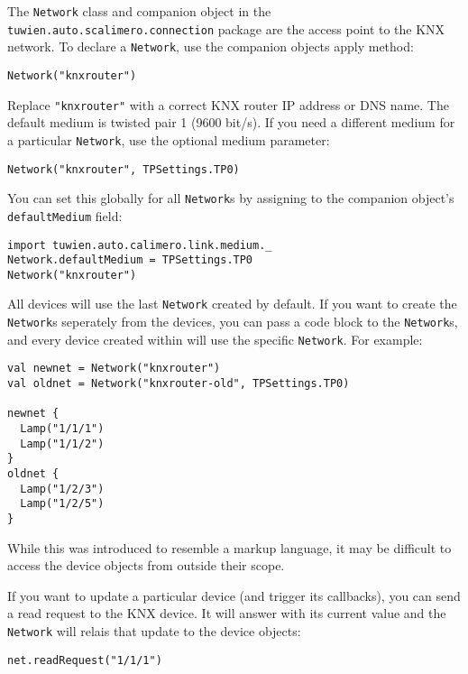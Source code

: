 The \lstinline!Network! class and companion object in the \lstinline!tuwien.auto.scalimero.connection! package are the access point to the KNX network. To declare a \lstinline!Network!, use the companion objects apply method:

\begin{lstlisting}
Network("knxrouter")
\end{lstlisting}

Replace \lstinline!"knxrouter"! with a correct KNX router IP address or DNS name. The default medium is twisted pair 1 (9600 bit/s). If you need a different medium for a particular \lstinline!Network!, use the optional medium parameter:

\begin{lstlisting}
Network("knxrouter", TPSettings.TP0)
\end{lstlisting}

You can set this globally for all \lstinline!Network!s by assigning to the companion object's \lstinline!defaultMedium! field:

\begin{lstlisting}
import tuwien.auto.calimero.link.medium._
Network.defaultMedium = TPSettings.TP0
Network("knxrouter")
\end{lstlisting}

All devices will use the last \lstinline!Network! created by default. If you want to create the \lstinline!Network!s seperately from the devices, you can pass a code block to the \lstinline!Network!s, and every device created within will use the specific \lstinline!Network!. For example:

\begin{lstlisting}
val newnet = Network("knxrouter")
val oldnet = Network("knxrouter-old", TPSettings.TP0)

newnet {
  Lamp("1/1/1")
  Lamp("1/1/2")
}
oldnet {
  Lamp("1/2/3")
  Lamp("1/2/5")
}
\end{lstlisting}

While this was introduced to resemble a markup language, it may be difficult to access the device objects from outside their scope.

If you want to update a particular device (and trigger its callbacks), you can send a read request to the KNX device. It will answer with its current value and the \lstinline!Network! will relais that update to the device objects:

\begin{lstlisting}
net.readRequest("1/1/1")
\end{lstlisting}

